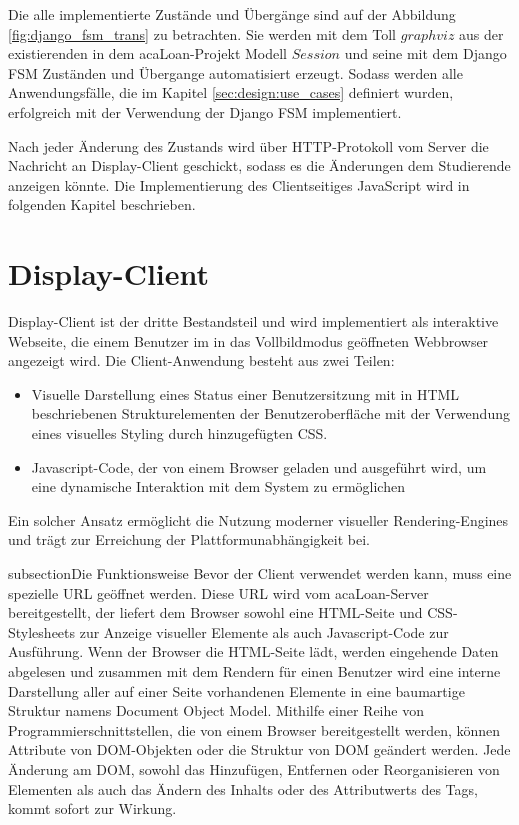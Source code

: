 Die alle implementierte Zustände und Übergänge sind auf der Abbildung \ref{fig:django_fsm_trans} zu betrachten. Sie werden mit dem Toll $graphviz$ aus der existierenden in dem acaLoan-Projekt Modell $Session$ und seine mit dem Django FSM Zuständen und Übergange automatisiert erzeugt. Sodass werden alle Anwendungsfälle, die im Kapitel \ref{sec:design:use_cases} definiert wurden, erfolgreich mit der Verwendung der Django FSM implementiert. 

Nach jeder Änderung des Zustands wird über HTTP-Protokoll vom Server die Nachricht an Display-Client geschickt, sodass es die Änderungen dem Studierende anzeigen könnte. Die Implementierung des Clientseitiges JavaScript wird in folgenden Kapitel beschrieben.  

\section{Display-Client}
\label{sec:display_client}
Display-Client ist der dritte Bestandsteil und wird implementiert als interaktive Webseite, die einem Benutzer im in das Vollbildmodus geöffneten Webbrowser angezeigt wird. Die Client-Anwendung besteht aus zwei Teilen: 
\begin{itemize}
	\item Visuelle Darstellung eines Status einer Benutzersitzung mit in HTML beschriebenen Strukturelementen der Benutzeroberfläche mit der Verwendung eines visuelles Styling durch hinzugefügten CSS.
	\item Javascript-Code, der von einem Browser geladen und ausgeführt wird, um eine dynamische Interaktion mit dem System zu ermöglichen
\end{itemize}
Ein solcher Ansatz ermöglicht die Nutzung moderner visueller Rendering-Engines und trägt zur Erreichung der Plattformunabhängigkeit bei. 


subsection{Die Funktionsweise}
\label{sec:display_client:funkt}
Bevor der Client verwendet werden kann, muss eine spezielle URL geöffnet werden. Diese URL wird vom acaLoan-Server bereitgestellt, der liefert dem Browser sowohl eine HTML-Seite und CSS-Stylesheets zur Anzeige visueller Elemente als auch Javascript-Code zur Ausführung. Wenn der Browser die HTML-Seite lädt, werden eingehende Daten abgelesen und zusammen mit dem Rendern für einen Benutzer wird eine interne Darstellung aller auf einer Seite vorhandenen Elemente in eine baumartige Struktur namens Document Object Model. Mithilfe einer Reihe von Programmierschnittstellen, die von einem Browser bereitgestellt werden, können Attribute von DOM-Objekten oder die Struktur von DOM geändert werden. Jede Änderung am DOM, sowohl das Hinzufügen, Entfernen oder Reorganisieren von Elementen als auch das Ändern des Inhalts oder des Attributwerts des Tags, kommt sofort zur Wirkung.


